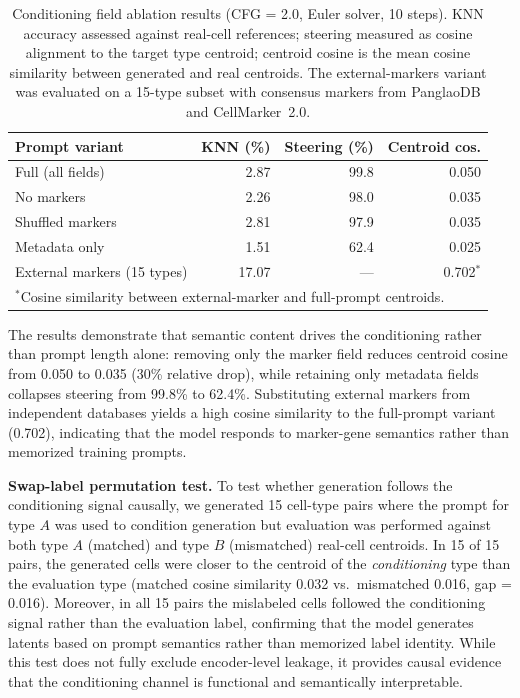 \documentclass[biology,article,submit,pdftex,moreauthors]{Definitions/mdpi}
\begin{document}
\begin{table}[htbp]
\centering
\caption{Conditioning field ablation results (CFG = 2.0, Euler solver, 10 steps). KNN accuracy assessed against real-cell references; steering measured as cosine alignment to the target type centroid; centroid cosine is the mean cosine similarity between generated and real centroids. The external-markers variant was evaluated on a 15-type subset with consensus markers from PanglaoDB and CellMarker~2.0.\label{tab:cond-ablation}}
\begin{tabular}{lrrr}
\toprule
Prompt variant & KNN (\%) & Steering (\%) & Centroid cos. \\
\midrule
Full (all fields) & 2.87 & 99.8 & 0.050 \\
No markers & 2.26 & 98.0 & 0.035 \\
Shuffled markers & 2.81 & 97.9 & 0.035 \\
Metadata only & 1.51 & 62.4 & 0.025 \\
External markers (15 types) & 17.07 & --- & 0.702$^*$ \\
\bottomrule
\multicolumn{4}{l}{\footnotesize $^*$Cosine similarity between external-marker and full-prompt centroids.}
\end{tabular}
\end{table}

The results demonstrate that semantic content drives the conditioning rather than prompt length alone: removing only the marker field reduces centroid cosine from 0.050 to 0.035 (30\% relative drop), while retaining only metadata fields collapses steering from 99.8\% to 62.4\%. Substituting external markers from independent databases yields a high cosine similarity to the full-prompt variant (0.702), indicating that the model responds to marker-gene semantics rather than memorized training prompts.

\textbf{Swap-label permutation test.} To test whether generation follows the conditioning signal causally, we generated 15 cell-type pairs where the prompt for type $A$ was used to condition generation but evaluation was performed against both type $A$ (matched) and type $B$ (mismatched) real-cell centroids. In 15 of 15 pairs, the generated cells were closer to the centroid of the \emph{conditioning} type than the evaluation type (matched cosine similarity 0.032 vs.\ mismatched 0.016, gap = 0.016). Moreover, in all 15 pairs the mislabeled cells followed the conditioning signal rather than the evaluation label, confirming that the model generates latents based on prompt semantics rather than memorized label identity. While this test does not fully exclude encoder-level leakage, it provides causal evidence that the conditioning channel is functional and semantically interpretable.
\end{document}
